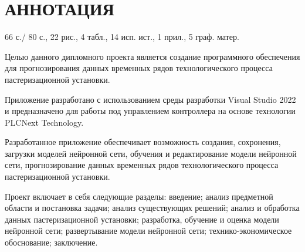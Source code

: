 \documentclass[a4paper, oneside, openany]{report}
\newcommand{\sectionbreak}{\clearpage}
\newcommand\redline{\hspace{1.5cm}} %
\newcommand\subtitlespace{\vspace{39pt}} %
\newcommand\gostFont{\cyrillicfont \englishfont \fontsize{13pt}{15.6pt}\selectfont} %
\newcommand\gostTitleFont{\cyrillicfont \englishfont \fontsize{13pt}{0pt}\selectfont \bfseries} %
\begin{document}
 

	\sectionbreak \section*{
		\gostTitleFont
		\redline 
		АННОТАЦИЯ
	}
	
	\subtitlespace
	
	{\gostFont
	
	\par \redline 66 с./ 80 с.,  22 рис.,  4 табл., 14 исп. ист., 1 прил., 5 граф. матер.
	
	\par \redline Целью данного дипломного проекта является создание программного обеспечения для прогнозирования данных временных рядов технологического процесса пастеризационной установки. 
	
	\par \redline Приложение разработано с использованием среды разработки Visual Studio 2022 и предназначено для работы под управлением контроллера на основе технологии PLCNext Technology. 
	
	\par \redline Разработанное приложение обеспечивает возможность создания, сохронения, загрузки моделей нейронной сети, обучения и редактирование модели нейронной сети, прогнозирование данных временных рядов технологического процесса пастеризационной установки.
	 
	\par \redline Проект включает в себя следующие разделы: введение; анализ предметной области и постановка задачи; анализ существующих решений; анализ и обработка данных пастеризационной установки; разработка, обучение и оценка модели нейронной сети; развертывание модели нейронной сети; технико-экономическое обоснование; заключение. 

	\par 
	
    }
	
\end{document}

